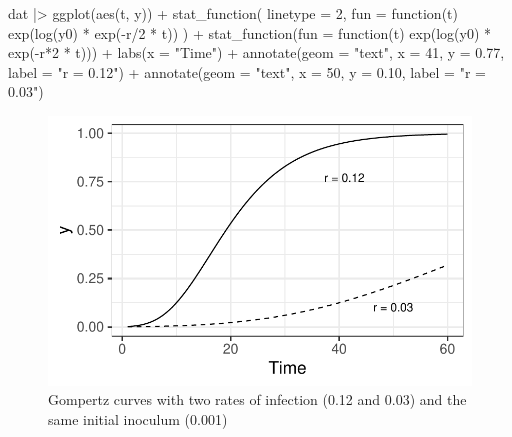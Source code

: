 \documentclass[
  letterpaper,
  DIV=11,
  numbers=noendperiod]{scrreprt}
\newenvironment{Shaded}{\begin{snugshade}}{\end{snugshade}}
\newcommand{\AttributeTok}[1]{\textcolor[rgb]{0.40,0.45,0.13}{#1}}
\newcommand{\ControlFlowTok}[1]{\textcolor[rgb]{0.00,0.23,0.31}{#1}}
\newcommand{\DecValTok}[1]{\textcolor[rgb]{0.68,0.00,0.00}{#1}}
\newcommand{\FloatTok}[1]{\textcolor[rgb]{0.68,0.00,0.00}{#1}}
\newcommand{\FunctionTok}[1]{\textcolor[rgb]{0.28,0.35,0.67}{#1}}
\newcommand{\NormalTok}[1]{\textcolor[rgb]{0.00,0.23,0.31}{#1}}
\newcommand{\SpecialCharTok}[1]{\textcolor[rgb]{0.37,0.37,0.37}{#1}}
\newcommand{\StringTok}[1]{\textcolor[rgb]{0.13,0.47,0.30}{#1}}
\begin{document}
\begin{Shaded}
\begin{Highlighting}[]
\NormalTok{dat }\SpecialCharTok{|\textgreater{}}
  \FunctionTok{ggplot}\NormalTok{(}\FunctionTok{aes}\NormalTok{(t, y)) }\SpecialCharTok{+}
  \FunctionTok{stat\_function}\NormalTok{(}
    \AttributeTok{linetype =} \DecValTok{2}\NormalTok{,}
    \AttributeTok{fun =} \ControlFlowTok{function}\NormalTok{(t) }\FunctionTok{exp}\NormalTok{(}\FunctionTok{log}\NormalTok{(y0) }\SpecialCharTok{*} \FunctionTok{exp}\NormalTok{(}\SpecialCharTok{{-}}\NormalTok{r}\SpecialCharTok{/}\DecValTok{2} \SpecialCharTok{*}\NormalTok{ t))}
\NormalTok{  ) }\SpecialCharTok{+}
  \FunctionTok{stat\_function}\NormalTok{(}\AttributeTok{fun =} \ControlFlowTok{function}\NormalTok{(t) }\FunctionTok{exp}\NormalTok{(}\FunctionTok{log}\NormalTok{(y0) }\SpecialCharTok{*} \FunctionTok{exp}\NormalTok{(}\SpecialCharTok{{-}}\NormalTok{r}\SpecialCharTok{*}\DecValTok{2} \SpecialCharTok{*}\NormalTok{ t))) }\SpecialCharTok{+}
  \FunctionTok{labs}\NormalTok{(}\AttributeTok{x =} \StringTok{"Time"}\NormalTok{) }\SpecialCharTok{+}
  \FunctionTok{annotate}\NormalTok{(}\AttributeTok{geom =} \StringTok{"text"}\NormalTok{, }\AttributeTok{x =} \DecValTok{41}\NormalTok{, }\AttributeTok{y =} \FloatTok{0.77}\NormalTok{, }\AttributeTok{label =} \StringTok{"r = 0.12"}\NormalTok{) }\SpecialCharTok{+}
  \FunctionTok{annotate}\NormalTok{(}\AttributeTok{geom =} \StringTok{"text"}\NormalTok{, }\AttributeTok{x =} \DecValTok{50}\NormalTok{, }\AttributeTok{y =} \FloatTok{0.10}\NormalTok{, }\AttributeTok{label =} \StringTok{"r = 0.03"}\NormalTok{)}
\end{Highlighting}
\end{Shaded}

\begin{figure}[H]

{\centering \includegraphics{temporal-models_files/figure-pdf/fig-gomp1-1.pdf}

}

\caption{\label{fig-gomp1}Gompertz curves with two rates of infection
(0.12 and 0.03) and the same initial inoculum (0.001)}

\end{figure}
\end{document}
